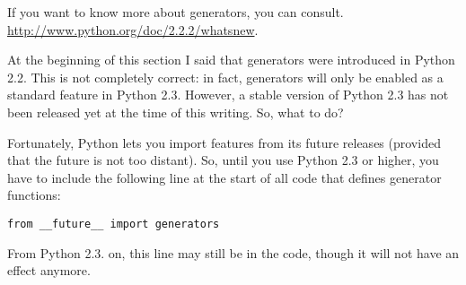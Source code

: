 If you want to know more about generators, you can consult.
\url{http://www.python.org/doc/2.2.2/whatsnew}. 

\begin{notice}[warning]
At the beginning of this section I said that generators were
introduced in Python 2.2. This is not completely correct: in fact,
generators will only be enabled as a standard feature in Python 2.3.
However, a stable version of Python 2.3 has not been released yet at
the time of this writing. So, what to do?

Fortunately, Python lets you import features from its future releases
(provided that the future is not too distant). So, until you use
Python 2.3 or higher, you have to include the following line at the
start of all code that defines generator functions:

\begin{verbatim}
from __future__ import generators

\end{verbatim}

From Python 2.3. on, this line may still be in the code, though it
will not have an effect anymore.
\end{notice}

